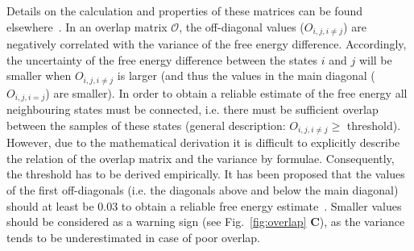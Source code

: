 \documentclass[9pt,bestpractices]{livecoms}
\begin{document}
Details on the calculation and properties of these matrices can be found elsewhere~\cite{klimovich2015guidelines}.
In an overlap matrix $\mathcal{O}$, the off-diagonal values (${O}_{i,j,i\ne j}$) are negatively correlated with the variance of the free energy difference. Accordingly, the uncertainty of the free energy difference between the states $i$ and $j$ will be smaller when ${O}_{i,j,i\ne j}$ is larger (and thus the values in the main diagonal (${O}_{i,j,i=j}$) are smaller). In order to obtain a reliable estimate of the free energy all neighbouring states must be connected, i.e. there must be sufficient overlap between the samples of these states (general description: ${O}_{i,j,i\ne j}\ge$ threshold).
However, due to the mathematical derivation it is difficult to explicitly describe the relation of the overlap matrix and the variance by formulae. Consequently, the threshold has to be derived empirically. It has been proposed that the values of the first off-diagonals (i.e. the diagonals above and below the main diagonal) should at least be 0.03 to obtain a reliable free energy estimate~\cite{klimovich2015guidelines}. Smaller values should be considered as a warning sign (see Fig.~\ref{fig:overlap} \textbf{C}), as the variance tends to be underestimated in case of poor overlap.
%
\end{document}
